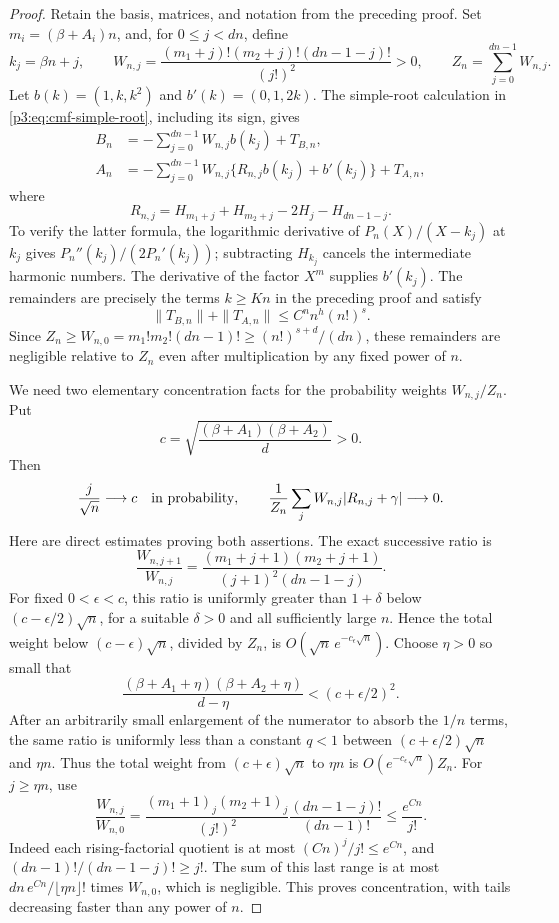 \documentclass[11pt,a4paper]{article}
\theoremstyle{definition}
\theoremstyle{remark}
\numberwithin{equation}{section}
\begin{document}
\begin{proof}
Retain the basis, matrices, and notation from the preceding proof.
Set $m_i=(\beta+A_i)n$, and, for $0\leq j<dn$, define
\[
 k_j=\beta n+j,\qquad
 W_{n,j}=\frac{(m_1+j)!(m_2+j)!(dn-1-j)!}{(j!)^2}>0,
 \qquad Z_n=\sum_{j=0}^{dn-1}W_{n,j}.
\]
Let $b(k)=(1,k,k^2)$ and $b'(k)=(0,1,2k)$. The simple-root
calculation in \eqref{p3:eq:cmf-simple-root}, including its sign, gives
\begin{align}
 B_n&=-\sum_{j=0}^{dn-1}W_{n,j}b(k_j)+T_{B,n},\\
 A_n&=-\sum_{j=0}^{dn-1}W_{n,j}
              \{R_{n,j}b(k_j)+b'(k_j)\}+T_{A,n},
 \label{p3:eq:cmf-weighted-rows}
\end{align}
where
\[
 R_{n,j}=H_{m_1+j}+H_{m_2+j}-2H_j-H_{dn-1-j}.
\]
To verify the latter formula, the logarithmic derivative of $P_n(X)/(X-k_j)$
at $k_j$ gives $P_n''(k_j)/(2P_n'(k_j))$; subtracting $H_{k_j}$
cancels the intermediate harmonic numbers. The derivative of the factor
$X^m$ supplies $b'(k_j)$. The remainders are precisely the terms
$k\geq Kn$ in the preceding proof and satisfy
\[
 \|T_{B,n}\|+\|T_{A,n}\|\leq C^n n^h(n!)^s.
\]
Since $Z_n\geq W_{n,0}=m_1!m_2!(dn-1)!\geq(n!)^{s+d}/(dn)$,
these remainders are negligible relative to $Z_n$ even after multiplication
by any fixed power of $n$.

We need two elementary concentration facts for the probability weights
$W_{n,j}/Z_n$. Put
\[
 c=\sqrt{\frac{(\beta+A_1)(\beta+A_2)}d}>0.
\]
Then
\begin{equation}
 \frac{j}{\sqrt n}\longrightarrow c\quad\hbox{in probability},
 \qquad
 \frac1{Z_n}\sum_j W_{n,j}|R_{n,j}+\gamma|\longrightarrow0.
 \label{p3:eq:cmf-concentration}
\end{equation}
Here are direct estimates proving both assertions. The exact successive
ratio is
\[
 \frac{W_{n,j+1}}{W_{n,j}}
 =\frac{(m_1+j+1)(m_2+j+1)}{(j+1)^2(dn-1-j)}.
\]
For fixed $0<\epsilon<c$, this ratio is uniformly greater than
$1+\delta$ below $(c-\epsilon/2)\sqrt n$, for a suitable $\delta>0$
and all sufficiently large $n$. Hence the total weight below
$(c-\epsilon)\sqrt n$, divided by $Z_n$, is
$O(\sqrt n\,e^{-c_\epsilon\sqrt n})$.
Choose $\eta>0$ so small that
\[
 \frac{(\beta+A_1+\eta)(\beta+A_2+\eta)}{d-\eta}
 <(c+\epsilon/2)^2.
\]
After an arbitrarily small enlargement of the numerator to absorb the
$1/n$ terms, the same ratio is uniformly less than a constant $q<1$
between $(c+\epsilon/2)\sqrt n$ and $\eta n$.
Thus the total weight from $(c+\epsilon)\sqrt n$ to $\eta n$ is
$O(e^{-c_\epsilon\sqrt n})Z_n$.
For $j\geq\eta n$, use
\[
 \frac{W_{n,j}}{W_{n,0}}
 =\frac{(m_1+1)_j(m_2+1)_j}{(j!)^2}
       \frac{(dn-1-j)!}{(dn-1)!}
 \leq\frac{e^{Cn}}{j!}.
\]
Indeed each rising-factorial quotient is at most $(Cn)^j/j!\leq e^{Cn}$,
and $(dn-1)!/(dn-1-j)!\geq j!$. The sum of this last range is at most
$dn\,e^{Cn}/\lfloor\eta n\rfloor!$ times $W_{n,0}$, which is negligible.
This proves concentration, with tails decreasing faster than any power
of $n$.


\end{proof}
\end{document}
